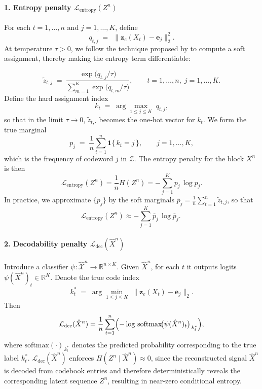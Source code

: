 \documentclass[12pt,review,authoryear]{elsarticle}
\theoremstyle{upright}
\begin{document}
\paragraph{1. Entropy penalty $\mathcal{L}_{\mathrm{entropy}}(Z^n)$}
For each \(t=1,\dots,n\) and \(j=1,\dots,K\), define
\[
q_{t,j} \;=\; \,\bigl\lVert \mathbf{z}_e(X_t) - \mathbf{e}_j\bigr\rVert_2^2.
\]
At temperature \(\tau>0\), we follow the technique proposed by \citet{agustsson2017soft} to compute a soft assignment, thereby making the entropy term differentiable:

\[
\tilde{z}_{t,j}
\;=\;
\frac{\exp\bigl(q_{t,j}/\tau\bigr)}
{\displaystyle \sum_{m=1}^K \exp\bigl(q_{t,m}/\tau\bigr)},
\qquad
t=1,\dots,n,\;j=1,\dots,K.
\]
Define the hard assignment index
\[
k_t \;=\; \arg\max_{1\le j\le K}\;q_{t,j},
\]
so that in the limit \(\tau\to 0\), \(\tilde{z}_{t,\cdot}\) becomes the one‐hot vector for \(k_t\).  We form the true marginal
\[
p_j \;=\; \frac{1}{n}\sum_{t=1}^n \mathbf{1}\{\,k_t = j\,\},
\qquad
j=1,\dots,K,
\]
which is the frequency of codeword \(j\) in $\mathcal{Z}$.  The entropy penalty for the block \(X^n\) is then
\[
\mathcal{L}_{\mathrm{entropy}}(Z^n)
=\frac{1}{n}H(Z^n)= -\sum_{j=1}^K p_j \,\log p_j.
\]
In practice, we approximate \(\{p_j\}\) by the soft marginals
\(\bar{p}_j = \frac{1}{n}\sum_{t=1}^n \tilde{z}_{t,j}\), so that
\[
\mathcal{L}_{\mathrm{entropy}}(Z^n)
\approx
-\sum_{j=1}^K \bar{p}_j \,\log \bar{p}_j.
\;%
\]


\paragraph{2. Decodability penalty \(\mathcal{L}_{\mathrm{dec}}(\hat{X}^n)\)}  
Introduce a classifier \(\psi:\hat{\mathcal{X}}^n\to\mathbb{R}^{n\times K}\).  Given \(\hat{X}^n\), for each \(t\) it outputs logits \(\psi(\hat{X}^n)_{t}\in\mathbb{R}^K\).  Denote the true code index 
\[
k_t^* \;=\; \arg\min_{1\le j\le K}\;\bigl\lVert \mathbf{z}_e(X_t) - \mathbf{e}_j\bigr\rVert_2.
\]
Then
\[
\mathcal{L}_{\mathrm{dec}}(\hat{X}^n)
=\frac{1}{n}\sum_{t=1}^n 
\Bigl(-\log\,\mathrm{softmax}\! \bigl(\psi(\hat{X}^n)_{t}\bigr)_{\,k_t^*}\Bigr),
\]
where \(\mathrm{softmax}(\cdot)_{\,k_t^*}\) denotes the predicted probability corresponding to the true label \(k_t^*\).  $\mathcal{L}_{\mathrm{dec}}(\hat{X}^n)$ enforces \(H(Z^n \mid \hat{X}^n)\approx 0\), since the reconstructed signal $\hat{X}^n$ is decoded from codebook entries and therefore deterministically reveals the corresponding latent sequence $Z^n$, resulting in near-zero conditional entropy.
\end{document}
